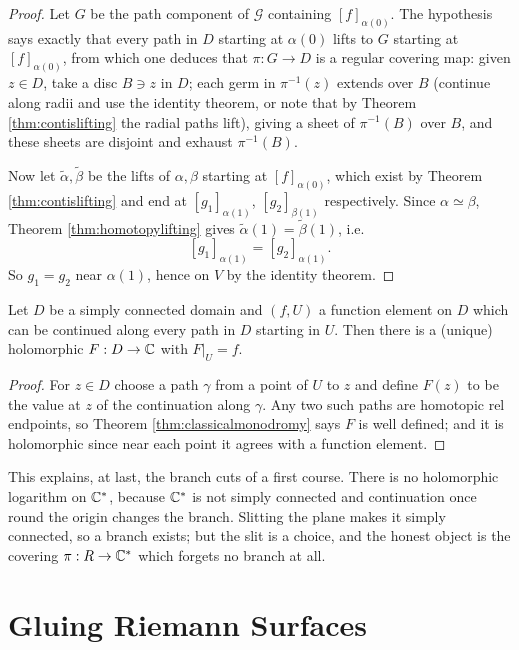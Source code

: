 \documentclass[a4paper]{scrartcl}
\newcommand{\Cs}{\C^*}
\begin{document}
\begin{proof}
	Let $G$ be the path component of $\mathcal{G}$ containing $[f]_{\alpha(0)}$. The
	hypothesis says exactly that every path in $D$ starting at $\alpha(0)$ lifts to $G$
	starting at $[f]_{\alpha(0)}$, from which one deduces that $\pi : G \to D$ is a regular
	covering map: given $z \in D$, take a disc $B \ni z$ in $D$; each germ in $\pi^{-1}(z)$
	extends over $B$ (continue along radii and use the identity theorem, or note that by
	Theorem \ref{thm:contislifting} the radial paths lift), giving a sheet of $\pi^{-1}(B)$
	over $B$, and these sheets are disjoint and exhaust $\pi^{-1}(B)$.

	Now let $\tilde\alpha, \tilde\beta$ be the lifts of $\alpha,\beta$ starting at
	$[f]_{\alpha(0)}$, which exist by Theorem \ref{thm:contislifting} and end at
	$[g_1]_{\alpha(1)}$, $[g_2]_{\beta(1)}$ respectively. Since $\alpha\simeq\beta$,
	Theorem \ref{thm:homotopylifting} gives $\tilde\alpha(1) = \tilde\beta(1)$, i.e.
	$$
	[g_1]_{\alpha(1)} = [g_2]_{\alpha(1)}.
	$$
	So $g_1 = g_2$ near $\alpha(1)$, hence on $V$ by the identity theorem.
\end{proof}

\begin{corollary}\label{cor:simplyconnectedcont}
	Let $D$ be a simply connected domain and $(f,U)$ a function element on $D$ which can be
	continued along every path in $D$ starting in $U$. Then there is a (unique) holomorphic
	$F : D \to \mathbb{C}$ with $F|_U = f$.
\end{corollary}

\begin{proof}
	For $z \in D$ choose a path $\gamma$ from a point of $U$ to $z$ and define $F(z)$ to be
	the value at $z$ of the continuation along $\gamma$. Any two such paths are homotopic
	rel endpoints, so Theorem \ref{thm:classicalmonodromy} says $F$ is well defined; and it
	is holomorphic since near each point it agrees with a function element.
\end{proof}

This explains, at last, the branch cuts of a first course. There is no holomorphic
logarithm on $\Cs$, because $\Cs$ is not simply connected and continuation once round the
origin changes the branch. Slitting the plane makes it simply connected, so a branch
exists; but the slit is a choice, and the honest object is the covering $\pi : R \to \Cs$
which forgets no branch at all.

\section{Gluing Riemann Surfaces}\label{sec:gluing}
\end{document}
